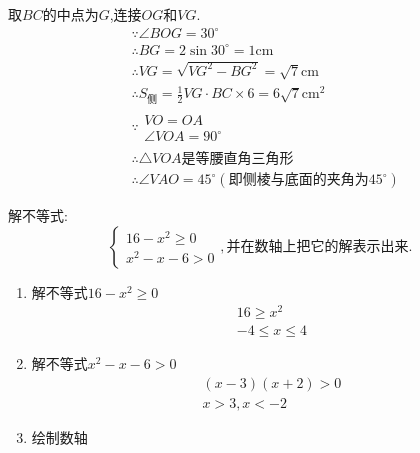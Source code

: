 \begin{questions}
\begin{solution}
		取$BC$的中点为$G$,连接$OG$和$VG$.
		\begin{align*}
			 & \because \angle{BOG} = 30^\circ                                             \\
			 & \therefore BG = 2\sin30^\circ = 1 \text{cm}                                 \\
			 & \therefore VG = \sqrt{VG^2 - BG^2} = \sqrt{7}\text{cm}                      \\
			 & \therefore S_{\text{侧}} = \frac12VG\cdot BC \times 6 = 6\sqrt{7}\text{cm}^2 \\
			 & \because
			\begin{array}{l}
				VO = OA \\
				\angle{VOA} = 90^\circ
			\end{array}                                                          \\
			 & \therefore \triangle{VOA}\text{是等腰直角三角形}                                    \\
			 & \therefore \angle{VAO} = 45^\circ (\text{即侧棱与底面的夹角为}45^\circ)
		\end{align*}
	\end{solution}

	\question[10] 解不等式:
	\begin{equation*}
		\begin{cases}
			16 - x^2 \geqslant 0 \\
			x^2 - x - 6 > 0
		\end{cases},并在数轴上把它的解表示出来.
	\end{equation*}
	\begin{solution}
		\begin{enumerate}[label=\Roman*.]
			\item 解不等式$16 - x^2 \geqslant 0$
			      \begin{align*}
				      16  \geqslant x^2 \\
				      -4 \leqslant x \leqslant 4
			      \end{align*}
			\item 解不等式$x^2 - x - 6 > 0$
			      \begin{align*}
				      (x-3)(x+2) > 0 \\
				      x > 3, x < -2
			      \end{align*}
			\item 绘制数轴

\end{enumerate}
\end{solution}
\end{questions}
